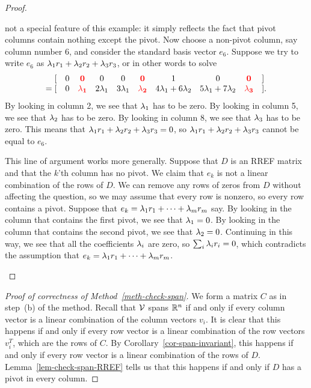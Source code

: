 \documentclass[reqno]{amsart}
\theoremstyle{definition}
\begin{document}
\begin{proof}
\begin{itemize}
   not a special feature of this example: it simply reflects the fact
   that pivot columns contain nothing except the pivot.  Now choose a
   non-pivot column, say column number $6$, and consider the standard
   basis vector $e_6$.  Suppose we try to write $e_6$ as
   $\lambda_1r_1+\lambda_2r_2+\lambda_3r_3$, or in other words to solve
   \[ \begin{array}{rccccccccl}
        [ & 0 & {\color{red}\mathbf{0}} & 0 & 0 &
          {\color{red}\mathbf{0}} & 1 & 0 & {\color{red}\mathbf{0}} & ] \\
       =[ & 0 & {\color{red}\mathbf{\lambda_1}} & 2\lambda_1 & 3\lambda_1 &
           {\color{red}\mathbf{\lambda_2}} & 4\lambda_1+6\lambda_2 &
            5\lambda_1+7\lambda_2 & {\color{red}\mathbf{\lambda_3}} &].
      \end{array}
   \]
   By looking in column 2, we see that
   $\lambda_1$ has to be zero.  By looking in column 5, we see that
   $\lambda_2$ has to be zero.  By looking in column 8, we see that
   $\lambda_3$ has to be zero.  This means that
   $\lambda_1r_1+\lambda_2r_2+\lambda_3r_3=0$, so $\lambda_1r_1+\lambda_2r_2+\lambda_3r_3$
   cannot be equal to $e_6$.

   This line of argument works more generally.  Suppose that $D$ is an
   RREF matrix and that the $k$'th column has no pivot.  We claim that
   $e_k$ is not a linear combination of the rows of $D$.  We can remove
   any rows of zeros from $D$ without affecting the question, so we
   may assume that every row is nonzero, so every row contains a
   pivot.  Suppose that $e_k=\lambda_1r_1+\dotsb+\lambda_mr_m$ say.  By
   looking in the column that contains the first pivot, we see that
   $\lambda_1=0$.  By looking in the column that contains the second
   pivot, we see that $\lambda_2=0$.  Continuing in this way, we see that
   all the coefficients $\lambda_i$ are zero, so $\sum_i\lambda_ir_i=0$, which
   contradicts the assumption that $e_k=\lambda_1r_1+\dotsb+\lambda_mr_m$.
 \end{itemize}
\end{proof}

\begin{proof}[Proof of correctness of Method~\ref{meth-check-span}]
 We form a matrix $C$ as in step~(b) of the method.  Recall that $\mathcal{V}$
 spans ${\mathbb{R}}^n$ if and only if every column vector is a linear
 combination of the column vectors $v_i$.  It is clear that this
 happens if and only if every row vector is a linear combination of
 the row vectors $v_i^T$, which are the rows of $C$.  By
 Corollary~\ref{cor-span-invariant}, this happens if and only if every
 row vector is a linear combination of the rows of $D$.
 Lemma~\ref{lem-check-span-RREF} tells us that this happens if and
 only if $D$ has a pivot in every column.
\end{proof}
\end{document}
